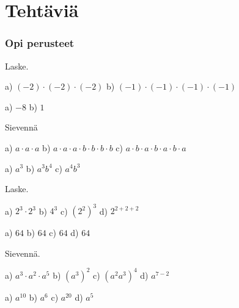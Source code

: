 \section*{Tehtäviä}

\subsubsection*{Opi perusteet}

Laske.
    \begin{tehtava}
        a) $(-2)\cdot(-2)\cdot(-2)$ \qquad
        b) $(-1)\cdot(-1)\cdot(-1)\cdot(-1)$

        \begin{vastaus}
            a) $ -8$ \qquad
            b) $1$
        \end{vastaus}
    \end{tehtava}

Sievennä
    \begin{tehtava}
        a) $a\cdot a\cdot a$ \quad
        b) $a\cdot a\cdot a\cdot b\cdot b\cdot b\cdot b$ \quad
        c) $a\cdot b\cdot a\cdot b\cdot a\cdot b\cdot a$
        
        \begin{vastaus}
            a) $a^3$ \qquad
            b) $a^3b^4$ \qquad
            c) $a^4b^3$
        \end{vastaus}
    \end{tehtava}

Laske.
    \begin{tehtava}
        a) $2^3\cdot2^3$ \qquad
        b) $4^3$ \qquad
        c) $(2^2)^3$ \qquad
        d) $2^{2+2+2}$

        \begin{vastaus}
            a) $64$ \qquad
            b) $64$ \qquad
            c) $64$ \qquad
            d) $64$
        \end{vastaus}
    \end{tehtava}

Sievennä.
\begin{tehtava}
        a) $a^3\cdot a^2\cdot a^5$ \qquad
        b) $(a^3)^2$ \qquad
        c) $(a^2a^3)^4$ \qquad
        d) $a^{7-2}$

        \begin{vastaus}
            a) $a^{10}$ \qquad
            b) $a^6$ \qquad
            c) $a^{20}$ \qquad
            d) $a^5$
        \end{vastaus}
    \end{tehtava}

